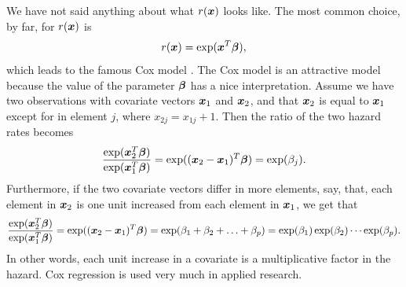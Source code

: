 We have not said anything about what $r(\bm{x})$ looks like. The most common choice, by far, for $r(\bm{x})$ is
\begin{equation*}
    r(\bm{x})=\exp(\bm{x}^T\boldsymbol{\beta}),
\end{equation*}
which leads to the famous Cox model \citep{cox-model}.
The Cox model is an attractive model because the value of the parameter $\boldsymbol{\beta}$ has a nice interpretation.
Assume we have two observations with covariate vectors $\bm{x}_1$ and $\bm{x}_2$, and that $\bm{x}_2$ is equal to $\bm{x}_1$ except for in element $j$, where $x_{2j}=x_{1j}+1$.
Then the ratio of the two hazard rates becomes
\begin{equation*}
    \frac{\exp(\bm{x}_2^T\boldsymbol{\beta})}{\exp(\bm{x}_1^T\boldsymbol{\beta})}=\exp((\bm{x}_2-\bm{x}_1)^T\boldsymbol{\beta})=\exp(\beta_j).
\end{equation*}
Furthermore, if the two covariate vectors differ in more elements, say, that, each element in $\bm{x}_2$ is one unit increased from each element in $\bm{x}_1$, we get that
\begin{equation*}
    \frac{\exp(\bm{x}_2^T\boldsymbol{\beta})}{\exp(\bm{x}_1^T\boldsymbol{\beta})}=\exp((\bm{x}_2-\bm{x}_1)^T\boldsymbol{\beta})=\exp(\beta_1+\beta_2+\ldots+\beta_p)=\exp(\beta_1)\exp(\beta_2)\cdots\exp(\beta_p).
\end{equation*}
In other words, each unit increase in a covariate is a multiplicative factor in the hazard.
Cox regression is used very much in applied research.


